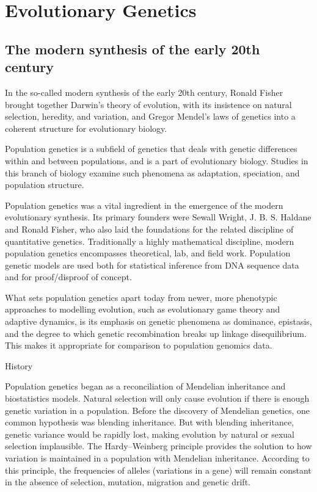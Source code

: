 \hypertarget{evolutionary-genetics}{%
\chapter{Evolutionary Genetics}\label{evolutionary-genetics}}

\hypertarget{the-modern-synthesis-of-the-early-20th-century}{%
\section{The modern synthesis of the early 20th century}\label{the-modern-synthesis-of-the-early-20th-century}}

In the so-called modern synthesis of the early 20th century, Ronald Fisher brought together Darwin's theory of evolution, with its insistence on natural selection, heredity, and variation, and Gregor Mendel's laws of genetics into a coherent structure for evolutionary biology.

Population genetics is a subfield of genetics that deals with genetic differences within and between populations, and is a part of evolutionary biology. Studies in this branch of biology examine such phenomena as adaptation, speciation, and population structure.

Population genetics was a vital ingredient in the emergence of the modern evolutionary synthesis. Its primary founders were Sewall Wright, J. B. S. Haldane and Ronald Fisher, who also laid the foundations for the related discipline of quantitative genetics. Traditionally a highly mathematical discipline, modern population genetics encompasses theoretical, lab, and field work. Population genetic models are used both for statistical inference from DNA sequence data and for proof/disproof of concept.

What sets population genetics apart today from newer, more phenotypic approaches to modelling evolution, such as evolutionary game theory and adaptive dynamics, is its emphasis on genetic phenomena as dominance, epistasis, and the degree to which genetic recombination breaks up linkage disequilibrium. This makes it appropriate for comparison to population genomics data.

History

Population genetics began as a reconciliation of Mendelian inheritance and biostatistics models. Natural selection will only cause evolution if there is enough genetic variation in a population. Before the discovery of Mendelian genetics, one common hypothesis was blending inheritance. But with blending inheritance, genetic variance would be rapidly lost, making evolution by natural or sexual selection implausible. The Hardy--Weinberg principle provides the solution to how variation is maintained in a population with Mendelian inheritance. According to this principle, the frequencies of alleles (variations in a gene) will remain constant in the absence of selection, mutation, migration and genetic drift.

